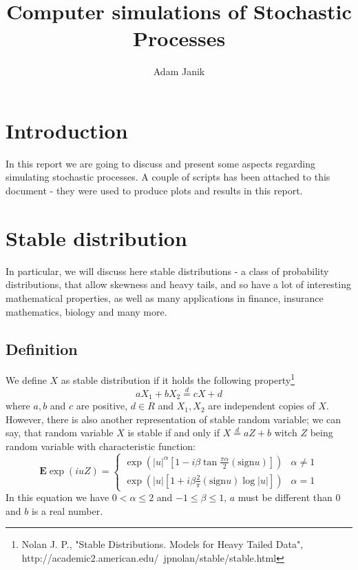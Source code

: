 \documentclass{article}
\title{Computer simulations of Stochastic Processes}
\author{Adam Janik}
\begin{document}
	\maketitle
	\newpage
	
	\section{Introduction}
	In this report we are going to discuss and present some aspects regarding simulating stochastic processes. A couple of scripts has been attached to this document - they were used to produce plots and results in this report.
	\section{Stable distribution}
	In particular, we will discuss here stable distributions - a class of probability distributions, that allow skewness and heavy tails, and so have a lot of interesting mathematical properties, as well as many applications in finance, insurance mathematics, biology and many more.
	\subsection{Definition}
	We define $X$ as stable distribution if it holds the following property\footnote{Nolan J. P., "Stable Distributions. Models for Heavy Tailed Data", http://academic2.american.edu/~jpnolan/stable/stable.html}
	\begin{equation}
	aX_1+bX_2 \stackrel{d}{=} cX + d
	\end{equation}
	where $a, b$ and $c$ are positive, $d\in R$ and $X_1, X_2$ are independent copies of $X$.
	However, there is also another representation of stable random variable; we can say, that random variable $X$ is stable if and only if $X \stackrel{d}{=} aZ + b$ witch $Z$ being random variable with characteristic function:
	\begin{equation}
		\mathbf{E} \exp(iuZ) = \begin{cases}
		\exp(|u|^\alpha[1-i\beta \tan\frac{\pi \alpha}{2}(\mbox{sign}u)]) & \alpha \neq 1 \\
		\exp(|u|[1+i\beta \frac{2}{\pi} (\mbox{sign}u) \log |u|]) & \alpha = 1
		\end{cases}
	\end{equation}
In this equation we have $0<\alpha \leq 2$ and $-1 \leq \beta \leq 1$, $a$ must be different than $0$ and $b$ is a real number.
\end{document}
